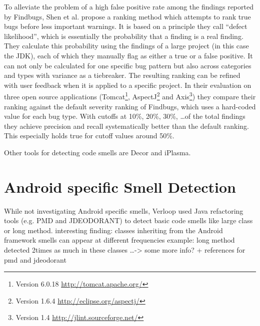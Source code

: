 To alleviate the problem of a high false positive rate among the findings reported by Findbugs, Shen et al. \cite{shen2011efindbugs} propose a ranking method which attempts to rank true bugs before less important warnings.
It is based on a principle they call ``defect likelihood'', which is essentially the probability that a finding is a real finding.
They calculate this probability using the findings of a large project (in this case the JDK), each of which they manually flag as either a true or a false positive.
It can not only be calculated for one specific bug pattern but also across categories and types with variance as a tiebreaker.
The resulting ranking can be refined with user feedback when it is applied to a specific project.
In their evaluation on three open source applications
(Tomcat\footnote{Version 6.0.18 \url{http://tomcat.apache.org/}}, AspectJ\footnote{Version 1.6.4 \url{http://eclipse.org/aspectj/}} and Axis\footnote{Version 1.4 \url{http://jlint.sourceforge.net/}})
they compare their ranking against the default severity ranking of Findbugs, which uses a hard-coded value for each bug type.
With cutoffs at 10\%, 20\%, 30\%, \ldots of the total findings they achieve precision and recall systematically better than the default ranking.
This especially holds true for cutoff values around 50\%.


Other tools for detecting code smells are Decor\cite{moha2010decor} and iPlasma\cite{Marinescu2005iPlasmaAI}.

\section{Android specific Smell Detection}



While not investigating Android specific smells,
Verloop \cite{verloop2013code} used Java refactoring tools (e.g. PMD and JDEODORANT) to detect basic code smells like large class or long method.
interesting finding: classes inheriting from the Android framework smells can appear at different frequencies
example: long method detected 2times as much in these classes
\ldots -> some more info? + references for pmd and jdeodorant


